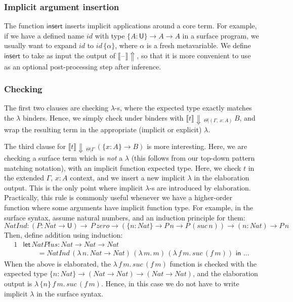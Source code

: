 \documentclass[acmsmall,review,anonymous,prologue,dvipsnames]{acmart}\settopmatter{printfolios=true,printccs=false,printacmref=false}
\newcommand{\slet}{\boldsymbol{\mathsf{let}}}
\renewcommand{\sin}{\boldsymbol{\mathsf{in}}}
\renewcommand{\U}{\mathsf{U}}
\newcommand{\blank}{\mathord{\hspace{1pt}\text{--}\hspace{1pt}}}
\newcommand{\mi}[1]{\mathit{#1}}
\newcommand{\einferblank}{\llbracket\blank\rrbracket\!\Uparrow}
\newcommand{\echeck}[4]{\llbracket#1\rrbracket\!\Downarrow\,_{#2|#3}\,#4}
\newcommand{\einsert}{\mathsf{insert}}
\theoremstyle{remark}
\begin{document}
\subsubsection{Implicit argument insertion}
The function $\einsert$ inserts implicit applications around a core term. For
example, if we have a defined name $id$ with type $\{A : \U\}\to A \to A$ in a
surface program, we usually want to expand $id$ to $id\,\{\alpha\}$, where
$\alpha$ is a fresh metavariable. We define $\einsert$ to take as input the
output of $\einferblank$, so that it is more convenient to use as an optional
post-processing step after inference.

\subsubsection{Checking}
The first two clauses are checking $\lambda$-s, where the expected type exactly
matches the $\lambda$ binders. Hence, we simply check under binders with
$\echeck{t}{\Theta}{(\Gamma,\,x:A)} B$, and wrap the resulting term in the
appropriate (implicit or explicit) $\lambda$.

The third clause for $\echeck{t}{\Theta}{\Gamma}{(\{x : A\}\to B)}$ is more
interesting. Here, we are checking a surface term which is \emph{not} a
$\lambda$ (this follows from our top-down pattern matching notation), with an
implicit function expected type. Here, we check $t$ in the extended $\Gamma,\,x
: A$ context, and we insert a new implicit $\lambda$ in the elaboration
output. This is the only point where implicit $\lambda$-s are introduced by
elaboration. Practically, this rule is commonly useful whenever we have a
higher-order function where some arguments have implicit function type. For
example, in the surface syntax, assume natural numbers, and an induction
principle for them:
\[
\mi{NatInd} : (P : \mi{Nat} \to \U)\to \,P\,\mi{zero} \to (\{n : \mi{Nat}\}\to P\,n \to
         P\,(\mi{suc}\,n)) \to (n : \mi{Nat}) \to P\,n
\]
Then, define addition using induction:
\begin{alignat*}{1}
& \slet\, \mi{NatPlus} : \mi{Nat} \to \mi{Nat} \to \mi{Nat}\\
& \qquad = \mi{NatInd}\,(\lambda\,n.\,\mi{Nat}\to \mi{Nat})\,(\lambda\,m.\,m)\,
                        (\lambda\,f\,m.\,\mi{suc}\,(f\,m))\,\,\sin\,\,...
\end{alignat*}
When the above is elaborated, the $\lambda\,f\,m.\,\mi{suc}\,(f\,m)$ function is
checked with the expected type $\{n : \mi{Nat}\}\to (\mi{Nat} \to \mi{Nat}) \to
(\mi{Nat} \to \mi{Nat})$, and the elaboration output is
$\lambda\,\{n\}\,f\,m.\,\mi{suc}\,(f\,m)$.  Hence, in this case we do not have
to write implicit $\lambda$ in the surface syntax.
\end{document}
